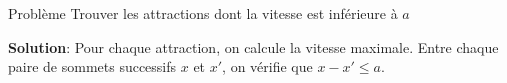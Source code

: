 \begin{frame}
    \frametitle{\problemtitle}
        \begin{block}
            {Problème} Trouver les attractions dont la vitesse est inférieure à $a$
        \end{block}
        \pause
        \textbf{Solution}: Pour chaque attraction, on calcule la vitesse maximale. Entre chaque paire de sommets successifs $x$ et $x'$, on vérifie que $x-x' \leq a$.
        \pause\solvestats
\end{frame}


